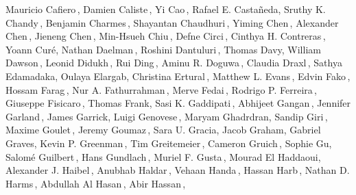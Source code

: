 \begin{center}
Mauricio Cafiero\,,\;
Damien Caliste\,,\;
Yi Cao\,,\;
Rafael E. Castañeda,\;
Sruthy K. Chandy\,,\;
Benjamin Charmes\,,\;
Shayantan Chaudhuri\,,\;
Yiming Chen\,,\;
Alexander Chen\,,\;
Jieneng Chen\,,\;
Min-Hsueh Chiu\,,\;
Defne Circi\,,\;
Cinthya H. Contreras\,,\;
Yoann Cur\'e,\;
Nathan Daelman\,,\;
Roshini Dantuluri\,,\;
Thomas Davy,\;
William Dawson\,,\;
Leonid Didukh\,,\;
Rui Ding\,,\;
Aminu R. Doguwa\,,\;
Claudia Draxl\,,\;
Sathya Edamadaka,\;
Oulaya Elargab,\;
Christina Ertural\,,\;
Matthew L. Evans\,,\;
Edvin Fako\,,\;
Hossam Farag\,,\;
Nur A. Fathurrahman\,,\;
Merve Fedai\,,\;
Rodrigo P. Ferreira\,,\;
Giuseppe Fisicaro\,,\;
Thomas Frank,\;
Sasi K. Gaddipati\,,\;
Abhijeet Gangan\,,\;
Jennifer Garland\,,\;
James Garrick,\;
Luigi Genovese\,,\;
Maryam Ghadrdran,\;
Sandip Giri\,,\;
Maxime Goulet\,,\;
Jeremy Goumaz\,,\;
Sara U. Gracia,\;
Jacob Graham, \;
Gabriel Graves,\;
Kevin P. Greenman\,,\;
Tim Greitemeier\,,\;
Cameron Gruich\,,\;
Sophie Gu,\;
Salomé Guilbert\,,\;
Hans Gundlach\,,\;
Muriel F. Gusta\,,\;
Mourad El Haddaoui,\;
Alexander J. Haibel\,,\;
Anubhab Haldar\,,\;
Vehaan Handa\,,\;
Hassan Harb\,,\;
Nathan D. Harms\,,\;
Abdullah Al Hasan\,,\;
Abir Hassan\,,\;

\end{center}
